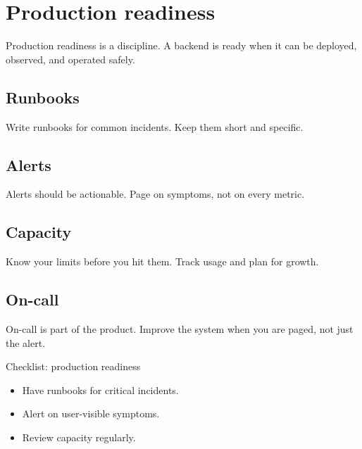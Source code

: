 \chapter{Production readiness}

Production readiness is a discipline.
A backend is ready when it can be deployed, observed, and operated safely.

\section{Runbooks}
Write runbooks for common incidents.
Keep them short and specific.

\section{Alerts}
Alerts should be actionable.
Page on symptoms, not on every metric.

\section{Capacity}
Know your limits before you hit them.
Track usage and plan for growth.

\section{On-call}
On-call is part of the product.
Improve the system when you are paged, not just the alert.

\begin{checklistbox}{Checklist: production readiness}
\begin{itemize}[nosep]
  \item Have runbooks for critical incidents.
  \item Alert on user-visible symptoms.
  \item Review capacity regularly.
\end{itemize}
\end{checklistbox}
